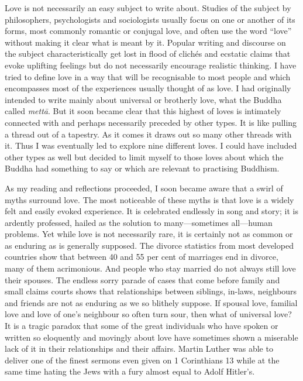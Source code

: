 \documentclass[10pt, openright]{book}
\begin{document}
Love is not necessarily an easy subject to write about. Studies of the subject by philosophers, psychologists and sociologists usually focus on one or another of its forms, most commonly romantic or conjugal love, and often use the word “love” without making it clear what is meant by it. Popular writing and discourse on the subject characteristically get lost in flood of clichés and ecstatic claims that evoke uplifting feelings but do not necessarily encourage realistic thinking. I have tried to define love in a way that will be recognisable to most people and which encompasses most of the experiences usually thought of as love. I had originally intended to write mainly about universal or brotherly love, what the Buddha called \textit{mettā}. But it soon became clear that this highest of loves is intimately connected with and perhaps necessarily preceded by other types. It is like pulling a thread out of a tapestry. As it comes it draws out so many other threads with it. Thus I was eventually led to explore nine different loves. I could have included other types as well but decided to limit myself to those loves about which the Buddha had something to say or which are relevant to practising Buddhism.


As my reading and reflections proceeded, I soon became aware that a swirl of myths surround love. The most noticeable of these myths is that love is a widely felt and easily evoked experience. It is celebrated endlessly in song and story; it is ardently professed, hailed as the solution to many—sometimes all—human problems. Yet while love is not necessarily rare, it is certainly not as common or as enduring as is generally supposed. The divorce statistics from most developed countries show that between 40 and 55 per cent of marriages end in divorce, many of them acrimonious. And people who stay married do not always still love their spouses. The endless sorry parade of cases that come before family and small claims courts shows that relationships between siblings, in-laws, neighbours and friends are not as enduring as we so blithely suppose. If spousal love, familial love and love of one’s neighbour so often turn sour, then what of universal love? It is a tragic paradox that some of the great individuals who have spoken or written so eloquently and movingly about love have sometimes shown a miserable lack of it in their relationships and their affairs. Martin Luther was able to deliver one of the finest sermons even given on 1 Corinthians 13 while at the same time hating the Jews with a fury almost equal to Adolf Hitler’s.
\end{document}

